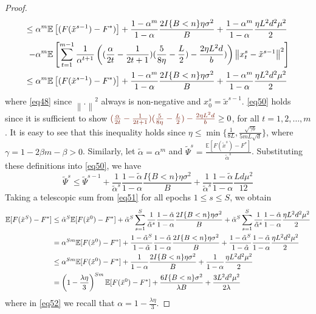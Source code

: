 \documentclass{article}
\newcommand*{\E}{\mathbb{E}}
\newcommand{\norm}[1]{\left\lVert#1\right\rVert}
\theoremstyle{definition}
\theoremstyle{remark}
\begin{document}
\begin{proof}
{\begin{align}
\leq\alpha^m\E&\left[(F(\tilde{x}^{s-1}) - F^*)\right] + \frac{1-\alpha^m}{1-\alpha}\frac{2I\{B < n\}\eta \sigma ^2}{B}+\frac{1-\alpha^m}{1-\alpha}\frac{\eta L^2 d^2 \mu^2}{2}\notag
\\-\alpha^m\E&\left[\sum_{t=1}^{m-1}\frac{1}{\alpha^{t+1}}\left((\frac{\alpha}{2t} - \frac{1}{2t+1})(\frac{5}{8\eta} - \frac{L}{2})-\frac{2\eta L^2 d}{b})\right) \norm{x_{t}^s-\tilde{x}^{s-1}}^2 \right]\notag\\
\leq\alpha^m\E&\left[(F(\tilde{x}^{s-1}) - F^*)\right] + \frac{1-\alpha^m}{1-\alpha}\frac{2I\{B < n\}\eta \sigma ^2}{B}+\frac{1-\alpha^m}{1-\alpha}\frac{\eta L^2 d^2 \mu^2}{2}\label{eq50}
\end{align}
}
where \eqref{eq48} since $\norm{.}^2$ always is non-negative and $x_0^s=\tilde{x}^{s-1}$. \eqref{eq50} holds since it is sufficient to show ${\color{Brown} (\frac{\alpha}{2t} - \frac{1}{2t+1})(\frac{5}{8\eta} - \frac{L}{2})- \frac{2\eta L^2 d}{b}} \geq 0$, for all $t=1, 2,\ldots, m$. 
It is easy to see that this inequality holds since $\eta \leq \min\{\frac{1}{8L}, \frac{\sqrt{\gamma b}}{5 m L \sqrt{d}}\}$, where $\gamma = 1-2\beta m-\beta > 0$. Similarly, let  $\tilde{\alpha} = \alpha^m$ and $\tilde{\Psi}^s = \frac{\E[F(\tilde{x}^{s})-F^*]}{\tilde{\alpha}^s}$. Substituting these definitions into \eqref{eq50}, we have
{\color{Brown}
\begin{equation}\label{eq51}
\tilde{\Psi}^s \leq \tilde{\Psi}^{s-1} + \frac{1}{\tilde{\alpha}^s} \frac{1-\tilde{\alpha}}{1-{\alpha}}\frac{I\{B < n\}\eta \sigma ^2}{B}+ \frac{1}{\tilde{\alpha}^s} \frac{1-\tilde{\alpha}}{1-{\alpha}}\frac{L d \mu^2}{12}
\end{equation}
}
Taking a telescopic sum from \eqref{eq51} for all epochs $1 \leq s \leq S$, we obtain
{\color{Brown}
\begin{align}
\E[F(\tilde{x}^S) - {F}^*] & \leq \tilde{\alpha}^{S} \E[F(\tilde{x}^0) - {F}^*] + \tilde{\alpha}^{S} \sum_{s=1}^S \frac{1}{\tilde{\alpha}^s}\frac{1-\tilde{\alpha}}{1-{\alpha}}\frac{2I\{B < n\}\eta \sigma ^2}{B} + \tilde{\alpha}^{S} \sum_{s=1}^S \frac{1}{\tilde{\alpha}^s}\frac{1-\tilde{\alpha}}{1-{\alpha}}\frac{\eta L^2 d^2 \mu^2}{2}\notag\\
& = {\alpha}^{Sm} \E[F(\tilde{x}^0) - {F}^*] + \frac{1-\tilde{\alpha}^S}{1-\tilde{\alpha}}\frac{1-\tilde{\alpha}}{1-{\alpha}}\frac{2I\{B < n\}\eta \sigma ^2}{B}+ \frac{1-\tilde{\alpha}^S}{1-\tilde{\alpha}}\frac{1-\tilde{\alpha}}{1-{\alpha}}\frac{\eta L^2 d^2 \mu^2}{2}\notag\\
& \leq {\alpha}^{Sm} \E[F(\tilde{x}^0) - {F}^*] + \frac{1}{1-{\alpha}}\frac{2 I\{B < n\}\eta \sigma ^2}{B}+ \frac{1}{1-{\alpha}}\frac{\eta L^2 d^2 \mu^2}{2}\notag\\
& = \left(1-\frac{\lambda\eta}{3}\right)^{Sm} \E[F(\tilde{x}^0) - {F}^*] + \frac{6I\{B < n\} \sigma ^2}{\lambda B}+\frac{3 L^2 d^2 \mu^2}{2\lambda}\label{eq52}
\end{align}
}
where in \eqref{eq52} we recall that {\color{Brown}$\alpha = 1-\frac{\lambda\eta}{3}$}.
\end{proof}
\end{document}
